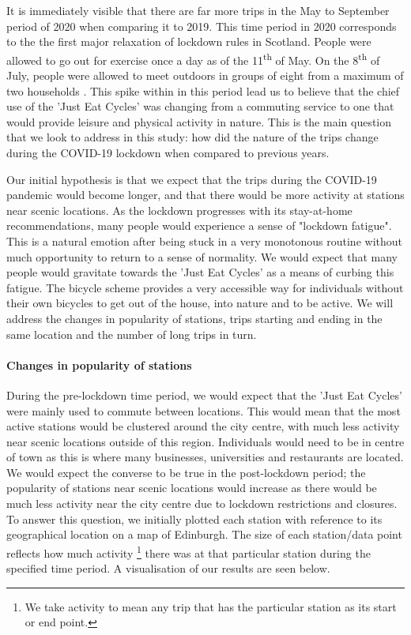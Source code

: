\documentclass[11pt,a4paper]{article}
\begin{document}
It is immediately visible that there are far more trips in the May to September period of 2020 when comparing it to 2019. This time period in 2020 corresponds to the the first major relaxation of lockdown rules in Scotland. People were allowed to go out for exercise once a day as of the 11\textsuperscript{th} of May. On the 8\textsuperscript{th} of July, people were allowed to meet outdoors in groups of eight from a maximum of two households \cite{timeline}. This spike within in this period lead us to believe that the chief use of the 'Just Eat Cycles' was changing from a commuting service to one that would provide leisure and physical activity in nature. This is the main question that we look to address in this study: how did the nature of the trips change during the COVID-19 lockdown when compared to previous years.
\par Our initial hypothesis is that we expect that the trips during the COVID-19 pandemic would become longer, and that there would be more activity at stations near scenic locations. As the lockdown progresses with its stay-at-home recommendations, many people would experience a sense of "lockdown fatigue". This is a natural emotion after being stuck in a very monotonous routine without much opportunity to return to a sense of normality. We would expect that many people would gravitate towards the 'Just Eat Cycles' as a means of curbing this fatigue. The bicycle scheme provides a very accessible way for individuals without their own bicycles to get out of the house, into nature and to be active. We will address the changes in popularity of stations, trips starting and ending in the same location and the number of long trips in turn.

\paragraph{Changes in popularity of stations} During the pre-lockdown time period, we would expect that the 'Just Eat Cycles' were mainly used to commute between locations. This would mean that the most active stations would be clustered around the city centre, with much less activity near scenic locations outside of this region. Individuals would need to be in centre of town as this is where many businesses, universities and restaurants are located. We would expect the converse to be true in the post-lockdown period; the popularity of stations near scenic locations would increase as there would be much less activity near the city centre due to lockdown restrictions and closures. To answer this question, we initially plotted each station with reference to its geographical location on a map of Edinburgh. The size of each station/data point reflects how much activity \footnote{We take activity to mean any trip that has the particular station as its start or end point.} there was at that particular station during the specified time period. A visualisation of our results are seen below.
\end{document}
